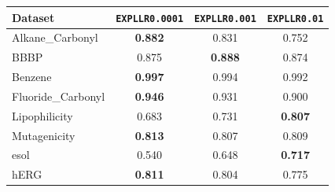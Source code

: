 \scriptsize
\begin{tabular}{lccc}
\hline
Dataset & \texttt{EXPLLR0.0001} & \texttt{EXPLLR0.001} & \texttt{EXPLLR0.01} \\ \hline
Alkane_Carbonyl & \textbf{0.882} & 0.831 & 0.752 \\
BBBP & 0.875 & \textbf{0.888} & 0.874 \\
Benzene & \textbf{0.997} & 0.994 & 0.992 \\
Fluoride_Carbonyl & \textbf{0.946} & 0.931 & 0.900 \\
Lipophilicity & 0.683 & 0.731 & \textbf{0.807} \\
Mutagenicity & \textbf{0.813} & 0.807 & 0.809 \\
esol & 0.540 & 0.648 & \textbf{0.717} \\
hERG & \textbf{0.811} & 0.804 & 0.775 \\
\hline
\end{tabular}

